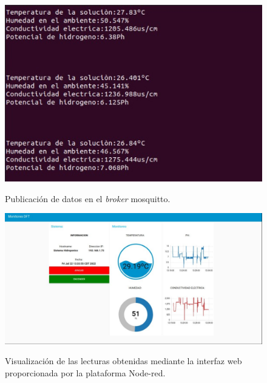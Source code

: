 \begin{figure}[H]
\centering
         \includegraphics[scale=0.7]{imgs/broker.jpeg} \\
    \caption{Publicación de datos en el \textit{broker} mosquitto.}\label{broker}
\end{figure}
\begin{figure}[H]
\centering
         \includegraphics[scale=0.4]{imgs/servidor1.jpeg} \\
    \caption{Visualización de las lecturas obtenidas mediante la interfaz web proporcionada por la plataforma Node-red.} \label{servidor}
\end{figure}

